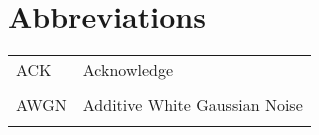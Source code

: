 \section*{Abbreviations}
\label{ch:abbreviations}

{}

\begin{table}[ht!]
    \begin{tabular}{l l}
        ACK & Acknowledge \\\\
        AWGN & Additive White Gaussian Noise \\\\
    \end{tabular}
\end{table}